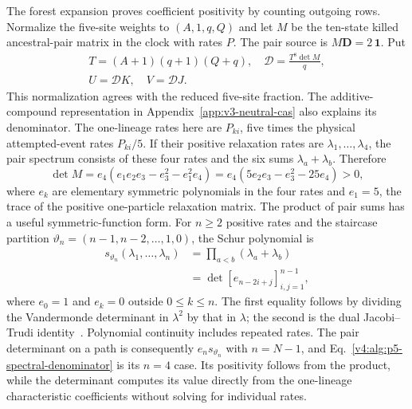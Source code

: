 \documentclass[aps,pre,reprint,amsmath,amssymb,longbibliography]{revtex4-2}
\begin{document}
The forest expansion proves coefficient positivity by counting outgoing
rows. Normalize the five-site weights to $(A,1,q,Q)$ and let $M$ be
the ten-state killed ancestral-pair matrix in the clock with rates $P$.
The pair source is $M\mathbf D=2\,\mathbf1$. Put
\begin{equation}
 \begin{gathered}
 T=(A+1)(q+1)(Q+q),\quad
 \mathscr D=\frac{T^8\det M}{q},\\
 U=\mathscr D K,\quad V=\mathscr D J.
 \end{gathered}
 \label{v4:alg:p5-normalization}
\end{equation}
This normalization agrees with the reduced five-site fraction. The
additive-compound representation in
Appendix~\ref{app:v3-neutral-cas} also explains its denominator. The
one-lineage rates here are $P_{ki}$,
five times the physical attempted-event rates $P_{ki}/5$.
If their positive relaxation rates are $\lambda_1,\ldots,\lambda_4$,
the pair spectrum consists of these four
rates and the six sums $\lambda_a+\lambda_b$. Therefore
\begin{equation}
 \det M=e_4(e_1e_2e_3-e_3^2-e_1^2e_4)
        =e_4(5e_2e_3-e_3^2-25e_4)>0,
 \label{v4:alg:p5-spectral-denominator}
\end{equation}
where $e_k$ are elementary symmetric polynomials in the four rates and
$e_1=5$, the trace of the positive one-particle relaxation matrix.
The product of pair sums has a useful symmetric-function form.
For $n\ge2$ positive rates and the staircase partition
$\vartheta_n=(n-1,n-2,\ldots,1,0)$, the Schur polynomial is
\begin{equation}
 \begin{aligned}
 s_{\vartheta_n}(\lambda_1,\ldots,\lambda_n)
 &=\prod_{a<b}(\lambda_a+\lambda_b)\\
 &=\det[e_{n-2i+j}]_{i,j=1}^{n-1},
 \end{aligned}
 \label{app:path-staircase-schur}
\end{equation}
where $e_0=1$ and $e_k=0$ outside $0\le k\le n$.
The first equality follows by dividing the Vandermonde determinant
in $\lambda^2$ by that in $\lambda$; the second is the dual
Jacobi--Trudi identity~\cite[Chap.~I, Sec.~3]{Macdonald1995}.
Polynomial continuity includes repeated rates. The pair determinant
on a path is consequently $e_n s_{\vartheta_n}$ with $n=N-1$,
and Eq.~\eqref{v4:alg:p5-spectral-denominator} is its $n=4$ case.
Its positivity follows from the product, while the determinant
computes its value directly from the one-lineage characteristic
coefficients without solving for individual rates.
\end{document}
